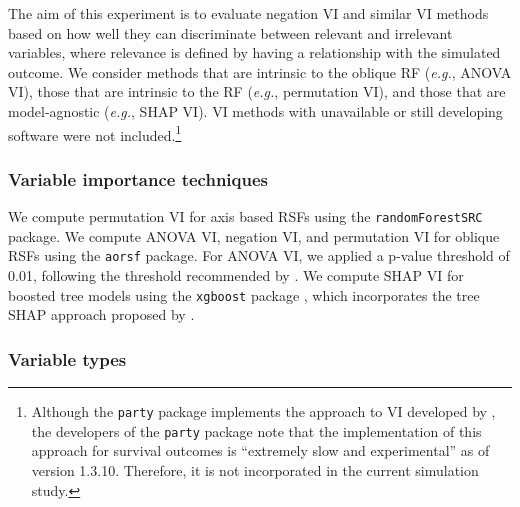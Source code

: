 \documentclass[12pt]{article}\usepackage[]{graphicx}\usepackage[]{xcolor}
\newcommand{\eg}{\textit{e.g.}}
\begin{document}
The aim of this experiment is to evaluate negation VI and similar VI methods based on how well they can discriminate between relevant and irrelevant variables, where relevance is defined by having a relationship with the simulated outcome. We consider methods that are intrinsic to the oblique RF (\eg, ANOVA VI), those that are intrinsic to the RF (\eg, permutation VI), and those that are model-agnostic (\eg, SHAP VI). VI methods with unavailable or still developing software were not included.\footnote{Although the \texttt{party} package implements the approach to VI developed by \citet{strobl2007bias}, the developers of the \texttt{party} package note that the implementation of this approach for survival outcomes is ``extremely slow and experimental'' as of version 1.3.10. Therefore, it is not incorporated in the current simulation study.}

\subsubsection{Variable importance techniques}

We compute permutation VI for axis based RSFs using the \texttt{randomForestSRC} package. We compute ANOVA VI, negation VI, and permutation VI for oblique RSFs using the \texttt{aorsf} package. For ANOVA VI, we applied a p-value threshold of 0.01, following the threshold recommended by \citet{menze2011oblique}. We compute SHAP VI for boosted tree models using the \texttt{xgboost} package \citep{xgboost}, which incorporates the tree SHAP approach proposed by \citet{lundberg2018consistent}.


\subsubsection{Variable types}
\end{document}
